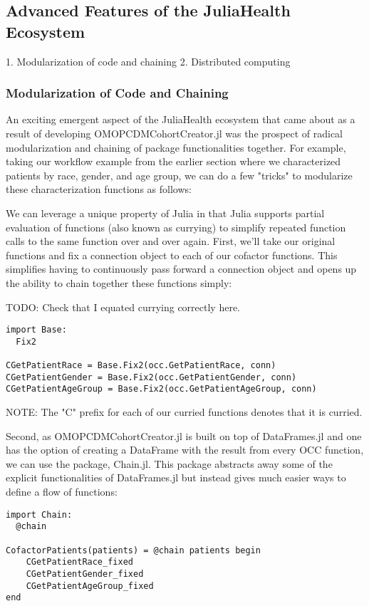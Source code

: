 \documentclass{juliacon}
\begin{document}
\subsection{Advanced Features of the JuliaHealth Ecosystem}

    1. Modularization of code and chaining
    2. Distributed computing

\subsubsection{Modularization of Code and Chaining}

An exciting emergent aspect of the JuliaHealth ecosystem that came about as a result of developing OMOPCDMCohortCreator.jl was the prospect of radical modularization and chaining of package functionalities together.
For example, taking our workflow example from the earlier section where we characterized patients by race, gender, and age group, we can do a few "tricks" to modularize these characterization functions as follows:


We can leverage a unique property of Julia in that Julia supports partial evaluation of functions (also known as currying) to simplify repeated function calls to the same function over and over again.
First, we'll take our original functions and fix a connection object to each of our cofactor functions.
This simplifies having to continuously pass forward a connection object and opens up the ability to chain together these functions simply:

TODO: Check that I equated currying correctly here.

\begin{verbatim}
import Base:
  Fix2

CGetPatientRace = Base.Fix2(occ.GetPatientRace, conn)
CGetPatientGender = Base.Fix2(occ.GetPatientGender, conn)
CGetPatientAgeGroup = Base.Fix2(occ.GetPatientAgeGroup, conn)
\end{verbatim}

NOTE: The "C" prefix for each of our curried functions denotes that it is curried.

Second, as OMOPCDMCohortCreator.jl is built on top of DataFrames.jl and one has the option of creating a DataFrame with the result from every OCC function, we can use the package, Chain.jl.
This package abstracts away some of the explicit functionalities of DataFrames.jl but instead gives much easier ways to define a flow of functions:

\begin{verbatim}
import Chain:
  @chain

CofactorPatients(patients) = @chain patients begin
    CGetPatientRace_fixed
    CGetPatientGender_fixed
    CGetPatientAgeGroup_fixed
end
\end{verbatim}
\end{document}
